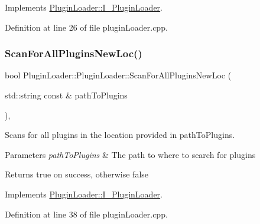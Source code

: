 Implements \mbox{\hyperlink{classPluginLoader_1_1I__PluginLoader}{Plugin\+Loader\+::\+I\+\_\+\+Plugin\+Loader}}.



Definition at line 26 of file plugin\+Loader.\+cpp.

\mbox{\label{classPluginLoader_1_1PluginLoader_a4dcb91357b495a63a5a9366057e8ec2c}} 
\subsubsection{\texorpdfstring{ScanForAllPluginsNewLoc()}{ScanForAllPluginsNewLoc()}}
{\footnotesize\ttfamily bool Plugin\+Loader\+::\+Plugin\+Loader\+::\+Scan\+For\+All\+Plugins\+New\+Loc (\begin{DoxyParamCaption}\item[{std\+::string const \&}]{path\+To\+Plugins }\end{DoxyParamCaption})\hspace{0.3cm}{\ttfamily [override]}, {\ttfamily [virtual]}}



Scans for all plugins in the location provided in path\+To\+Plugins. 


\begin{DoxyParams}{Parameters}
{\em path\+To\+Plugins} & The path to where to search for plugins \\
\hline
\end{DoxyParams}
\begin{DoxyReturn}{Returns}
true on success, otherwise false 
\end{DoxyReturn}


Implements \mbox{\hyperlink{classPluginLoader_1_1I__PluginLoader}{Plugin\+Loader\+::\+I\+\_\+\+Plugin\+Loader}}.



Definition at line 38 of file plugin\+Loader.\+cpp.

\mbox{\label{classPluginLoader_1_1PluginLoader_a38094a2d63eee060875475b04061e538}} 
